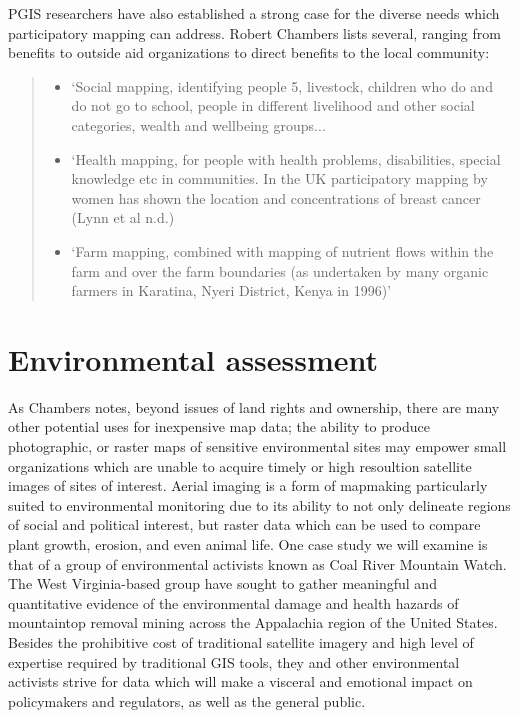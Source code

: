 \documentclass[11pt,oneside,notitlepage]{report}
\begin{document}
{{\ac{PGIS} researchers have also established a strong case for the diverse needs which participatory mapping can address. Robert Chambers lists several, ranging from benefits to outside aid organizations to direct benefits to the local community:

\begin{quote}
\begin{itemize}
	\item{`Social mapping, identifying people 5, livestock, children who do and do not go to school, people in different livelihood and other social categories, wealth and wellbeing groups...}
	\item{`Health mapping, for people with health problems, disabilities, special knowledge etc in communities. In the UK participatory mapping by women has shown the location and concentrations of breast cancer (Lynn et al n.d.)}
	\item{`Farm mapping, combined with mapping of nutrient flows within the farm and over the farm boundaries (as undertaken by many organic farmers in Karatina, Nyeri District, Kenya in 1996)'}
\end{itemize}
\cite{chambers2006whose}
\end{quote}

\section{Environmental assessment}

As Chambers notes, beyond issues of land rights and ownership, there are many other potential uses for inexpensive map data; the ability to produce photographic, or raster maps of sensitive environmental sites may empower small organizations which are unable to acquire timely or high resoultion satellite images of sites of interest. Aerial imaging is a form of mapmaking particularly suited to environmental monitoring due to its ability to not only delineate regions of social and political interest, but raster data which can be used to compare plant growth, erosion, and even animal life. One case study we will examine is that of a group of environmental activists known as Coal River Mountain Watch. The West Virginia-based group have sought to gather meaningful and quantitative evidence of the environmental damage and health hazards of mountaintop removal mining across the Appalachia region of the United States. Besides the prohibitive cost of traditional satellite imagery and high level of expertise required by traditional GIS tools, they and other environmental activists strive for data which will make a visceral and emotional impact on policymakers and regulators, as well as the general public. 

}}
\end{document}
